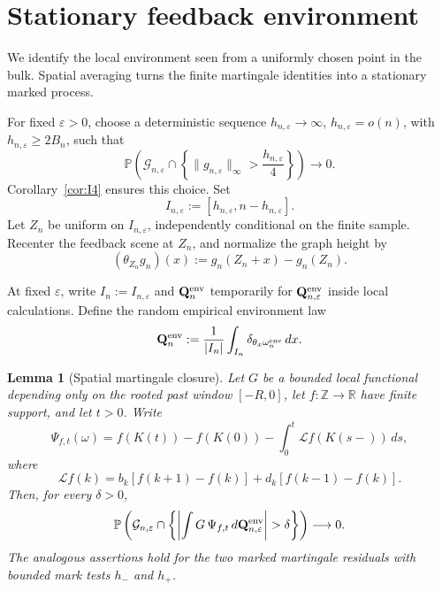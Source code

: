 \documentclass[11pt,reqno]{amsart}
\newtheorem{lemma}[theorem]{Lemma}
\theoremstyle{definition}
\theoremstyle{remark}
\numberwithin{equation}{section}
\newcommand{\Pp}{\mathbb P}
\begin{document}
\section{Stationary feedback environment}
\label{sec:environment}

We identify the local environment seen from a uniformly chosen point
in the bulk.  Spatial averaging turns the finite martingale identities
into a stationary marked process.

For fixed \(\varepsilon>0\), choose a deterministic sequence
\(h_{n,\varepsilon}\to\infty\),
\(h_{n,\varepsilon}=o(n)\), with
\(h_{n,\varepsilon}\ge 2B_n\), such that
\begin{equation}
\Pp\!\left(
\mathcal G_{n,\varepsilon}\cap
\left\{\|g_{n,\varepsilon}\|_\infty>
\frac{h_{n,\varepsilon}}4\right\}
\right)\longrightarrow0.
\label{eq:3.0}
\end{equation}
Corollary~\ref{cor:I4} ensures this choice.  Set
\[
I_{n,\varepsilon}:=[h_{n,\varepsilon},n-h_{n,\varepsilon}].
\]
Let \(Z_n\) be uniform on \(I_{n,\varepsilon}\), independently conditional on the finite
sample.  Recenter the feedback scene at \(Z_n\), and normalize the graph
height by
\[
(\theta_{Z_n}g_n)(x):=g_n(Z_n+x)-g_n(Z_n).
\]

At fixed \(\varepsilon\), write \(I_n:=I_{n,\varepsilon}\) and
\(\mathbf Q_n^{\rm env}\) temporarily for
\(\mathbf Q_{n,\varepsilon}^{\rm env}\) inside local calculations.
Define the random empirical environment law
\begin{equation}
\mathbf Q_n^{\rm env}
:=
\frac1{|I_n|}\int_{I_n}\delta_{\theta_x\omega_n^{\rm env}}\,dx.
\label{eq:3.0a}
\end{equation}

\begin{lemma}[Spatial martingale closure]
\label{lem:spatial-mp}
Let \(G\) be a bounded local functional depending only on the rooted
past window \([-R,0]\), let \(f:\mathbb Z\to\mathbb R\) have finite
support, and let \(t>0\).  Write
\[
\Psi_{f,t}(\omega)
=
f(K(t))-f(K(0))-\int_0^t\mathcal Lf(K(s-))\,ds,
\]
where
\[
\mathcal Lf(k)
=b_k[f(k+1)-f(k)]+d_k[f(k-1)-f(k)].
\]
Then, for every \(\delta>0\),
\begin{equation}
\Pp\left(
\mathcal G_{n,\varepsilon}\cap
\left\{\left|\int G\,\Psi_{f,t}\,d\mathbf Q_{n,\varepsilon}^{\rm env}\right|>\delta\right\}
\right)\longrightarrow0.
\label{eq:3.0b}
\end{equation}
The analogous assertions hold for the two marked martingale residuals
with bounded mark tests \(h_-\) and \(h_+\).
\end{lemma}
\end{document}
